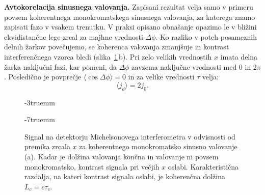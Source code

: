 \begin{example}{\bf Avtokorelacija sinusnega valovanja.}
Zapisani rezultat velja samo v primeru povsem koherentnega monokromatskega 
sinusnega valovanja, za katerega znamo zapisati fazo v vsakem trenutku. 
V praksi opisano obnašanje opazimo le v bližini ekvidistančne 
lege zrcal za majhne vrednosti $\Delta \phi$. Ko razliko v poteh posameznih delnih 
žarkov povečujemo, se koherenca valovanja zmanjšuje in kontrast interferenčnega vzorca bledi 
(slika~\ref{fig:08_sinkoh}\,b).
Pri zelo velikih vrednostih $x$ imata delna žarka naključni fazi, 
kar pomeni, da $\Delta \phi$ zavzema naključne vrednosti med $0$ in $2\pi$. 
Posledično je povprečje $\langle \cos \Delta \phi \rangle= 0$
in za velike vrednosti $\tau$ velja:
\begin{equation}
\langle j_d \rangle = 2 j_0.
\label{eq:08_18}
\end{equation}
\begin{figure}[ht]
\vglue-3truemm
\centering
\def\svgwidth{140truemm} 

\caption{Signal na detektorju Michelsonovega interferometra v odvisnosti od premika zrcala $x$
za koherentnego monokromatsko sinusno valovanje (a). Kadar je dolžina valovanja
končna in valovanje ni povsem monokromatsko, kontrast signala pri večjih $x$ oslabi.
Karakteristična razdalja, na kateri kontrast signala oslabi, 
 je koherenčna dolžina $L_c = c \tau_c$.
}
\label{fig:08_sinkoh}
\vglue-7truemm
\end{figure}

\end{example} 


